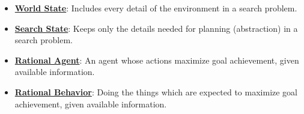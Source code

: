 \documentclass{article}%
\begin{document}
\begin{itemize}[leftmargin=*]
\item \href{https://www.math.purdue.edu/~yipn/351/14L1-DepthFS.pdf#page=37}{\textbf{World State}}: Includes every detail of the environment in a search problem.%
\item \href{https://www.math.purdue.edu/~yipn/351/14L1-DepthFS.pdf#page=37}{\textbf{Search State}}: Keeps only the details needed for planning (abstraction) in a search problem.%
\item \href{https://www.math.purdue.edu/~yipn/351/14L1-DepthFS.pdf#page=39}{\textbf{Rational Agent}}: An agent whose actions maximize goal achievement, given available information.%
\item \href{https://www.math.purdue.edu/~yipn/351/14L1-DepthFS.pdf#page=39}{\textbf{Rational Behavior}}: Doing the things which are expected to maximize goal achievement, given available information.%
\end{itemize}%
\end{document}
